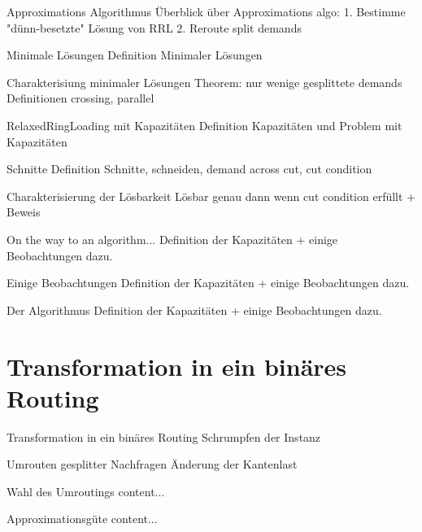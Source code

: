 \documentclass[8pt]{beamer}
\begin{document}
	\begin{frame}{Approximations Algorithmus}
		Überblick über Approximations algo: 1. Bestimme "dünn-besetzte" Lösung von RRL 2. Reroute split demands 
	\end{frame}

	\begin{frame}{Minimale Lösungen}
		Definition Minimaler Lösungen
	\end{frame}

	\begin{frame}{Charakterisiung minimaler Lösungen}
		Theorem: nur wenige gesplittete demands	\\
		Definitionen crossing, parallel	
	\end{frame}
		
	\begin{frame}{RelaxedRingLoading mit Kapazitäten}
		Definition Kapazitäten und Problem mit Kapazitäten	
	\end{frame}
	
	\begin{frame}{Schnitte}
		Definition Schnitte, schneiden, demand across cut, cut condition
	\end{frame}

	\begin{frame}{Charakterisierung der Lösbarkeit}
		Lösbar genau dann wenn cut condition erfüllt + Beweis
	\end{frame}

	\begin{frame}{On the way to an algorithm...}
		Definition der Kapazitäten + einige Beobachtungen dazu.
	\end{frame}

	\begin{frame}{Einige Beobachtungen}
		Definition der Kapazitäten + einige Beobachtungen dazu.
	\end{frame}

	\begin{frame}{Der Algorithmus}
		Definition der Kapazitäten + einige Beobachtungen dazu.
	\end{frame}

	\section{Transformation in ein binäres Routing}
	\begin{frame}{Transformation in ein binäres Routing}
		Schrumpfen der Instanz
	\end{frame}

	\begin{frame}{Umrouten gesplitter Nachfragen}
		Änderung der Kantenlast
	\end{frame}

	\begin{frame}{Wahl des Umroutings}
		content...
	\end{frame}
	
	\begin{frame}{Approximationsgüte}
		content...
	\end{frame}
	
	\begin{frame}[allowframebreaks]
		\nocite{*}
		
	\end{frame}
\end{document}
